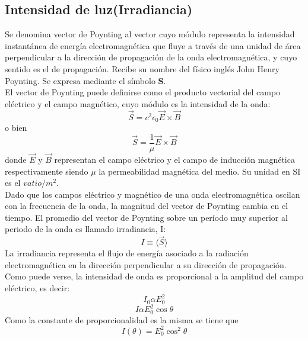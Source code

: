 \documentclass[13,twocolumn,letterpaper]{article}
\begin{document}
	\subsection*{Intensidad de luz(Irradiancia)}
	{
		Se denomina vector de Poynting al vector cuyo módulo representa la intensidad
		instantánea de energía electromagnética que fluye a través de una unidad de área
		perpendicular a la dirección de propagación de la onda electromagnética, y cuyo
		sentido es el de propagación. Recibe su nombre del físico inglés John Henry
		Poynting. Se expresa mediante el símbolo \textbf{S}.\\
		El vector de Poynting puede definirse como el producto vectorial del campo
		eléctrico y el campo magnético, cuyo módulo es la intensidad de la onda:	
		\begin{equation}\label{ec7}
		\vec{S}=c^{2}\epsilon_{0}\vec{E}\times\vec{B}
		\end{equation}
		o bien 
		\begin{equation}\label{ec8}
		\vec{S}=\dfrac{1}{\mu}\vec{E}\times\vec{B}
		\end{equation}
		donde $\vec{E}$ y $\vec{B}$ representan el campo el\'ectrico y el campo de inducción magnética respectivamente siendo $\mu$ la permeabilidad magnética del medio. Su unidad en SI es el $vatio/m^{2}$.\\
		Dado que los campos eléctrico y magnético de una onda electromagnética oscilan
		con la frecuencia de la onda, la magnitud del vector de Poynting cambia en el
		tiempo. El promedio del vector de Poynting sobre un período muy superior al
		periodo de la onda es llamado irradiancia, I:
		\begin{equation}\label{ec9}
		I\equiv\langle\vec{S}\rangle
		\end{equation}
		La irradiancia representa el flujo de energía asociado a la radiación
		electromagnética en la dirección perpendicular a su dirección de propagación.
		Como puede verse, la intensidad de onda es proporcional a la amplitud del campo
		eléctrico, es decir:
		\begin{equation}\label{ec10}
		I_{0}\alpha E_{0}^{2}
		\end{equation}
		\begin{equation}\label{ec11}
		I\alpha E_{0}^{2}\cos\theta
		\end{equation}
		Como la constante de proporcionalidad es la misma se tiene que 
		\begin{equation}\label{ec12}
		I(\theta)=E_{0}^{2}\cos^{2}\theta
		\end{equation}
	}
\end{document}
